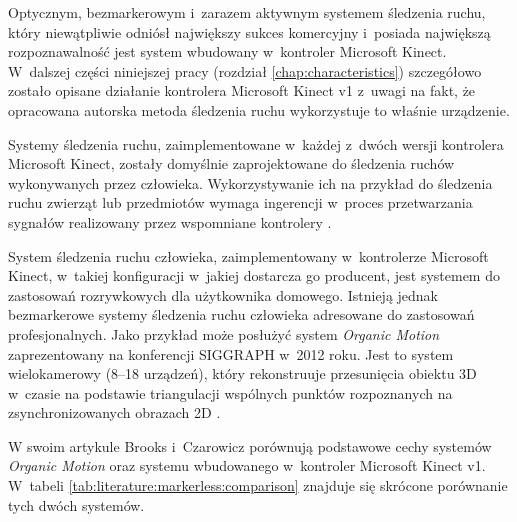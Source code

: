 Optycznym, bezmarkerowym i~zarazem aktywnym systemem śledzenia ruchu, który niewątpliwie odniósł największy sukces komercyjny i~posiada największą rozpoznawalność jest system wbudowany w~kontroler Microsoft Kinect. W~dalszej części niniejszej pracy (rozdział \ref{chap:characteristics}) szczegółowo zostało opisane działanie kontrolera Microsoft Kinect v1 z~uwagi na fakt, że opracowana autorska metoda śledzenia ruchu wykorzystuje to właśnie urządzenie. 
			
Systemy śledzenia ruchu, zaimplementowane w~każdej z~dwóch wersji kontrolera Microsoft Kinect, zostały domyślnie zaprojektowane do śledzenia ruchów wykonywanych przez człowieka. Wykorzystywanie ich na przykład do śledzenia ruchu zwierząt lub przedmiotów wymaga ingerencji w~proces przetwarzania sygnałów realizowany przez wspomniane kontrolery \cite{Nirjon2012}.
			
System śledzenia ruchu człowieka, zaimplementowany w~kontrolerze Microsoft Kinect, w~takiej konfiguracji w~jakiej dostarcza go producent, jest systemem do zastosowań rozrywkowych dla użytkownika domowego. Istnieją jednak bezmarkerowe systemy śledzenia ruchu człowieka adresowane do zastosowań profesjonalnych. Jako przykład może posłużyć system \emph{Organic Motion} zaprezentowany na konferencji SIGGRAPH w~2012 roku. Jest to system wielokamerowy (8--18 urządzeń), który rekonstruuje przesunięcia obiektu 3D w~czasie na podstawie triangulacji wspólnych punktów rozpoznanych na zsynchronizowanych obrazach 2D \cite{Brooks2012}.
			
W swoim artykule Brooks i~Czarowicz \cite{Brooks2012} porównują podstawowe cechy systemów \emph{Organic Motion} oraz systemu wbudowanego w~kontroler Microsoft Kinect v1. W~tabeli \ref{tab:literature:markerless:comparison} znajduje się skrócone porównanie tych dwóch systemów. 
			
